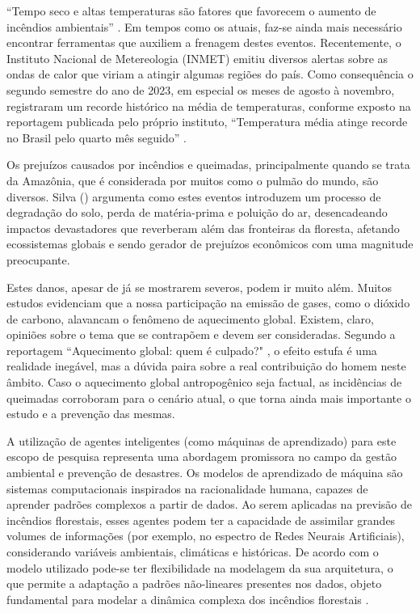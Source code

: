 
``Tempo seco e altas temperaturas são fatores que favorecem o aumento de incêndios ambientais'' \cite{Silva21}. Em tempos como os atuais, faz-se ainda mais necessário encontrar ferramentas que auxiliem a frenagem destes eventos. Recentemente, o Instituto Nacional de Metereologia (INMET) emitiu diversos alertas sobre as ondas de calor que viriam a atingir algumas regiões do país. Como consequência o segundo semestre do ano de 2023, em especial os meses de agosto à novembro, registraram um recorde histórico na média de temperaturas, conforme exposto na reportagem publicada pelo próprio instituto, ``Temperatura média atinge recorde no Brasil pelo quarto mês seguido'' \cite{inmet23:ondadecalor}.

Os prejuízos causados por incêndios e queimadas, principalmente quando se trata da Amazônia, que é considerada por muitos como o pulmão do mundo, são diversos. Silva (\citeyear{Silva21}) argumenta como estes eventos introduzem um processo de degradação do solo, perda de matéria-prima e poluição do ar, desencadeando impactos devastadores que reverberam além das fronteiras da floresta, afetando ecossistemas globais e sendo gerador de prejuízos econômicos com uma magnitude preocupante.

Estes danos, apesar de já se mostrarem severos, podem ir muito além. Muitos estudos evidenciam que a nossa participação na emissão de gases, como o dióxido de carbono, alavancam o fenômeno de aquecimento global. Existem, claro, opiniões sobre o tema que se contrapõem e devem ser consideradas. Segundo a reportagem ``Aquecimento global: quem é culpado?" \cite{Aguiar13}, o efeito estufa é uma realidade inegável, mas a dúvida paira sobre a real contribuição do homem neste âmbito. Caso o aquecimento global antropogênico seja factual, as incidências de queimadas corroboram para o cenário atual, o que torna ainda mais importante o estudo e a prevenção das mesmas.

A utilização de agentes inteligentes (como máquinas de aprendizado) para este escopo de pesquisa representa uma abordagem promissora no campo da gestão ambiental e prevenção de desastres. Os modelos de aprendizado de máquina são sistemas computacionais inspirados na racionalidade humana, capazes de aprender padrões complexos a partir de dados. Ao serem aplicadas na previsão de incêndios florestais, esses agentes podem ter a capacidade de assimilar grandes volumes de informações (por exemplo, no espectro de Redes Neurais Artificiais), considerando variáveis ambientais, climáticas e históricas. De acordo com o modelo utilizado pode-se ter flexibilidade na modelagem da sua arquitetura, o que permite a adaptação a padrões não-lineares presentes nos dados, objeto fundamental para modelar a dinâmica complexa dos incêndios florestais \cite{Ferneda06}.

